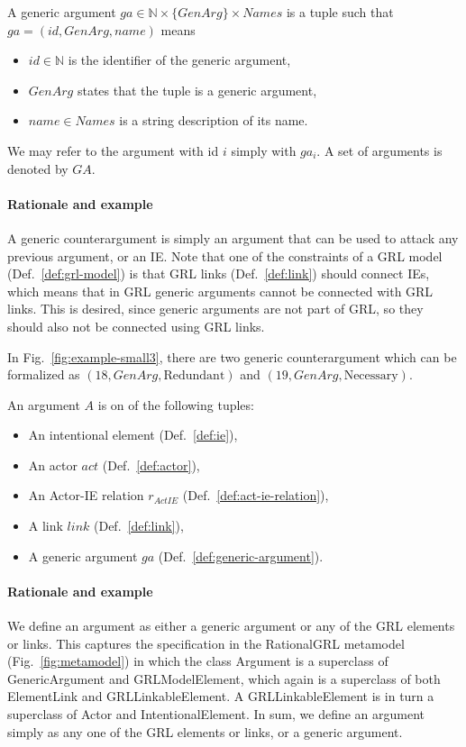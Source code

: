 \begin{definition}
\label{def:generic-argument}
A generic argument $ga \in \mathbb{N}\times \{GenArg\}\times Names$ is a tuple such that $ga=(id, GenArg, name)$ means
\begin{itemize}
\item $id\in \mathbb{N}$ is the identifier of the generic argument,
\item $GenArg$ states that the tuple is a generic argument,
\item $name\in Names$ is a string description of its name.
\end{itemize}
We may refer to the argument with id $i$ simply with $ga_i$. A set of arguments is denoted by $GA$.
\end{definition}

\paragraph{Rationale and example} A generic counterargument is simply an argument that can be used to attack any previous argument, or an IE. Note that one of the constraints of a GRL model (Def.~\ref{def:grl-model}) is that GRL links (Def.~\ref{def:link}) should connect IEs, which means that in GRL generic arguments cannot be connected with GRL links. This is desired, since generic arguments are not part of GRL, so they should also not be connected using GRL links. 

In Fig.~\ref{fig:example-small3}, there are two generic counterargument which can be formalized as $(18,GenArg, \text{Redundant})$ and $(19, GenArg, \text{Necessary})$.

\begin{definition}[Argument]
\label{def:argument}
An argument $A$ is on of the following tuples:
\begin{itemize}
\item An intentional element (Def.~\ref{def:ie}), 
\item An actor $act$ (Def.~\ref{def:actor}),
\item An Actor-IE relation $r_{ActIE}$ (Def.~\ref{def:act-ie-relation}), 
\item A link $link$ (Def.~\ref{def:link}),
\item A generic argument $ga$ (Def.~\ref{def:generic-argument}).
\end{itemize}
\end{definition}

\paragraph{Rationale and example} We define an argument as either a generic argument or any of the GRL elements or links. This captures the specification in the RationalGRL metamodel (Fig.~\ref{fig:metamodel}) in which the class \textsf{Argument} is a superclass of \textsf{GenericArgument} and \textsf{GRLModelElement}, which again is a superclass of both \textsf{ElementLink} and \textsf{GRLLinkableElement}. A \textsf{GRLLinkableElement} is in turn a superclass of \textsf{Actor} and \textsf{IntentionalElement}. In sum, we define an argument simply as any one of the GRL elements or links, or a generic argument.

